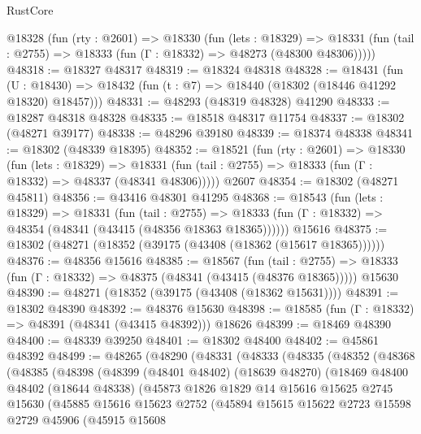 \begin{lexlean}{RustCore}
\begin{coremodule}
  @18328
    (fun (rty : @2601) =>
    @18330
      (fun (lets : @18329) =>
      @18331 (fun (tail : @2755) => @18333 (fun (Γ : @18332) => @48273 (@48300 @48306)))))
@48318 := @18327 @48317
@48319 := @18324 @48318
@48328 := @18431
    (fun (U : @18430) => @18432 (fun (t : @7) => @18440 (@18302 (@18446 @41292 @18320) @18457)))
@48331 := @48293 (@48319 @48328) @41290
@48333 := @18287 @48318 @48328
@48335 := @18518 @48317 @11754
@48337 := @18302 (@48271 @39177)
@48338 := @48296 @39180
@48339 := @18374 @48338
@48341 := @18302 (@48339 @18395)
@48352 := @18521
    (fun (rty : @2601) =>
    @18330
      (fun (lets : @18329) =>
      @18331 (fun (tail : @2755) => @18333 (fun (Γ : @18332) => @48337 (@48341 @48306)))))
    @2607
@48354 := @18302 (@48271 @45811)
@48356 := @43416 @48301 @41295
@48368 := @18543
    (fun (lets : @18329) =>
    @18331
      (fun (tail : @2755) =>
      @18333 (fun (Γ : @18332) => @48354 (@48341 (@43415 (@48356 @18363 @18365))))))
    @15616
@48375 := @18302 (@48271 (@18352 (@39175 (@43408 (@18362 (@15617 @18365))))))
@48376 := @48356 @15616
@48385 := @18567
    (fun (tail : @2755) => @18333 (fun (Γ : @18332) => @48375 (@48341 (@43415 (@48376 @18365)))))
    @15630
@48390 := @48271 (@18352 (@39175 (@43408 (@18362 @15631))))
@48391 := @18302 @48390
@48392 := @48376 @15630
@48398 := @18585 (fun (Γ : @18332) => @48391 (@48341 (@43415 @48392))) @18626
@48399 := @18469 @48390
@48400 := @48339 @39250
@48401 := @18302 @48400
@48402 := @45861 @48392
@48499 := @48265
    (@48290
      (@48331
        (@48333
          (@48335
            (@48352
              (@48368
                (@48385
                  (@48398
                    (@48399
                      (@48401 @48402)
                      (@18639 @48270)
                      (@18469
                        @48400
                        @48402
                        (@18644 @48338)
                        (@45873
                          @1826
                          @1829
                          @14
                          @15616
                          @15625
                          @2745
                          @15630
                          (@45885
                            @15616
                            @15623
                            @2752
                            (@45894
                              @15615
                              @15622
                              @2723
                              @15598
                              @2729
                              @45906
                              (@45915
                                @15608

\end{coremodule}
\end{lexlean}
